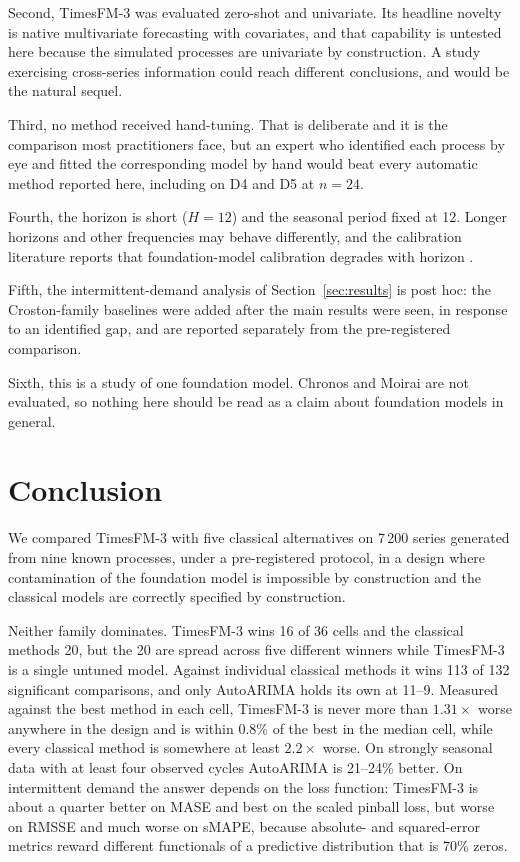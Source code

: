\documentclass[article]{ajs}
\providecommand{\sectionref}[1]{Section~\ref{#1}}
\begin{document}
Second, TimesFM-3 was evaluated zero-shot and univariate. Its headline novelty is native
multivariate forecasting with covariates, and that capability is untested here because the
simulated processes are univariate by construction. A study exercising cross-series information
could reach different conclusions, and would be the natural sequel.

Third, no method received hand-tuning. That is deliberate and it is the comparison most
practitioners face, but an expert who identified each process by eye and fitted the
corresponding model by hand would beat every automatic method reported here, including on D4
and D5 at $n = 24$.

Fourth, the horizon is short ($H = 12$) and the seasonal period fixed at 12. Longer horizons
and other frequencies may behave differently, and the calibration literature reports that
foundation-model calibration degrades with horizon \citep{adler2026calibrated}.

Fifth, the intermittent-demand analysis of \sectionref{sec:results} is post hoc: the
Croston-family baselines were added after the main results were seen, in response to an
identified gap, and are reported separately from the pre-registered comparison.

Sixth, this is a study of one foundation model. Chronos \citep{ansari2024chronos} and Moirai
\citep{woo2024moirai} are not evaluated, so nothing here should be read as a claim about
foundation models in general.

\section{Conclusion}

We compared TimesFM-3 with five classical alternatives on 7\,200 series generated from nine
known processes, under a pre-registered protocol, in a design where contamination of the
foundation model is impossible by construction and the classical models are correctly specified
by construction.

Neither family dominates. TimesFM-3 wins 16 of 36 cells and the classical methods 20, but the
20 are spread across five different winners while TimesFM-3 is a single untuned model. Against
individual classical methods it wins 113 of 132 significant comparisons, and only AutoARIMA
holds its own at 11--9. Measured against the best method in each cell, TimesFM-3 is never more
than $1.31\times$ worse anywhere in the design and is within 0.8\% of the best in the median
cell, while every classical method is somewhere at least $2.2\times$ worse. On strongly seasonal
data with at least four observed cycles AutoARIMA is 21--24\% better. On intermittent demand the
answer depends on the loss function: TimesFM-3 is about a quarter better on MASE and best on the
scaled pinball loss, but worse on RMSSE and much worse on sMAPE, because absolute- and
squared-error metrics reward different functionals of a predictive distribution that is 70\%
zeros.
\end{document}
